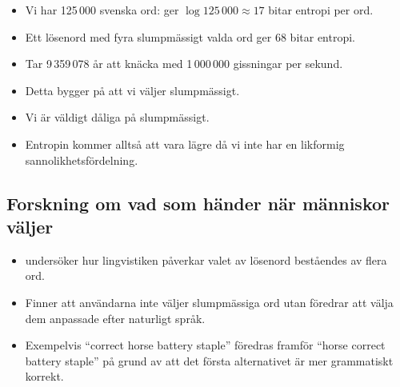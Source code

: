 \documentclass{beamer}
\begin{document}
\begin{frame}
  \begin{example}
    \begin{itemize}
      \item Vi har 125\,000 svenska ord: ger \(\log 125\,000\approx 17\) bitar 
        entropi per ord.

      \item Ett lösenord med fyra slumpmässigt valda ord ger 68 bitar entropi.

      \item Tar 9\,359\,078 år att knäcka med 1\,000\,000 gissningar per sekund.

    \end{itemize}
  \end{example}
\end{frame}

\begin{frame}
  \begin{remark}
    \begin{itemize}
      \item Detta bygger på att vi väljer slumpmässigt.

      \item Vi är väldigt dåliga på slumpmässigt.

      \item Entropin kommer alltså att vara lägre då vi inte har en likformig 
        sannolikhetsfördelning.

    \end{itemize}
  \end{remark}
\end{frame}

\subsection{Forskning om vad som händer när människor väljer}

\begin{frame}
  \begin{itemize}
    \item \citet{Bonneau2012lpo} undersöker hur lingvistiken påverkar valet av 
      lösenord beståendes av flera ord.

    \item Finner att användarna inte väljer slumpmässiga ord utan föredrar att 
      välja dem anpassade efter naturligt språk.

    \item Exempelvis \enquote{correct horse battery staple} föredras framför 
      \enquote{horse correct battery staple} på grund av att det första 
      alternativet är mer grammatiskt korrekt.

  \end{itemize}
\end{frame}
\end{document}
